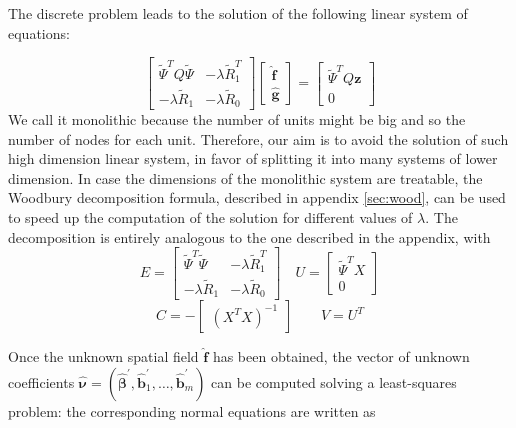 The discrete problem leads to the solution of the following linear system of
equations:

\begin{equation}
	\label{mono}
	\begin{bmatrix}
		\tilde{\Psi}^TQ\tilde{\Psi} & -\lambda \tilde{R}_1^T \\
		-\lambda \tilde{R}_1        & -\lambda \tilde{R}_0
	\end{bmatrix}
	\begin{bmatrix}
		\hat{\mathbf{f}} \\
		\hat{\mathbf{g}}
	\end{bmatrix}
	=
	\begin{bmatrix}
		\tilde{\Psi}^T Q\mathbf{z} \\
		0
	\end{bmatrix}
\end{equation}
We call it monolithic because the number of units might be big and so
the number of nodes for each unit. Therefore, our aim is to avoid the solution
of such high dimension linear system, in favor of splitting it into many
systems of lower dimension. In case the dimensions of the monolithic system are
treatable, the Woodbury decomposition formula, described in appendix
\ref{sec:wood}, can be used to speed up the computation of the solution for
different values of $\lambda$. The decomposition is entirely analogous to the
one described in the appendix, with
\begin{equation}
	\label{eq:wootilde}
	E =
	\begin{bmatrix}
		\tilde{\Psi}^T\tilde{\Psi} & -\lambda \tilde{R}_1^T \\
		-\lambda \tilde{R}_1       & -\lambda \tilde{R}_0
	\end{bmatrix}
	\quad U =
	\begin{bmatrix}
		\tilde{\Psi}^TX \\
		0
	\end{bmatrix}
\end{equation}
\begin{equation*}
	C = -
	\begin{bmatrix}
		\left(X^TX\right)^{-1}
	\end{bmatrix}
	\quad \quad V = U^T
\end{equation*}

Once the unknown spatial field $\hat{\bm{f}}$ has been obtained, the vector of
unknown coefficients $\hat{\bm{\nu}} = (\hat{\bm{\beta}}^\prime,
	\hat{\bm{b}}_1^\prime, \dots, \hat{\bm{b}}_m^\prime)$ can be computed solving a
least-squares problem: the corresponding normal equations are written as


